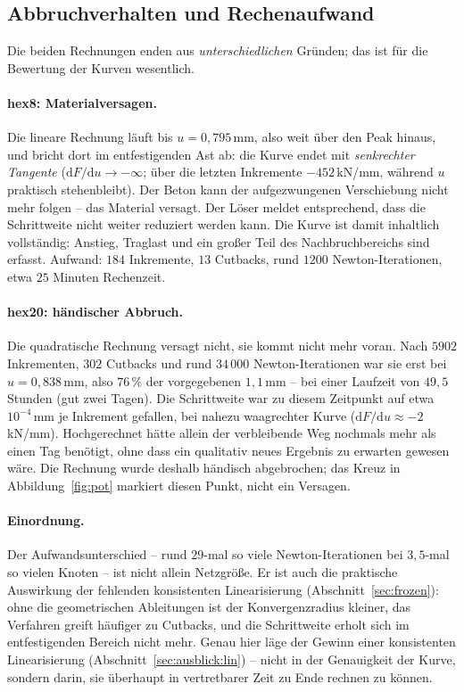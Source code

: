 \documentclass[a4paper,11pt]{article}
\begin{document}
\subsection{Abbruchverhalten und Rechenaufwand}
Die beiden Rechnungen enden aus \emph{unterschiedlichen} Gründen; das ist für die Bewertung der
Kurven wesentlich.

\paragraph{hex8: Materialversagen.}
Die lineare Rechnung läuft bis $u=0{,}795$\,mm, also weit über den Peak hinaus, und bricht dort im
entfestigenden Ast ab: die Kurve endet mit \emph{senkrechter Tangente}
($\mathrm dF/\mathrm du\to-\infty$; über die letzten Inkremente $-452$\,kN/mm, während $u$ praktisch
stehenbleibt). Der Beton kann der aufgezwungenen Verschiebung nicht mehr folgen -- das Material
versagt. Der Löser meldet entsprechend, dass die Schrittweite nicht weiter reduziert werden kann.
Die Kurve ist damit inhaltlich vollständig: Anstieg, Traglast und ein großer Teil des
Nachbruchbereichs sind erfasst. Aufwand: $184$ Inkremente, $13$ Cutbacks, rund $1200$
Newton-Iterationen, etwa $25$ Minuten Rechenzeit.

\paragraph{hex20: händischer Abbruch.}
Die quadratische Rechnung versagt nicht, sie kommt nicht mehr voran. Nach $5902$ Inkrementen,
$302$ Cutbacks und rund $34\,000$ Newton-Iterationen war sie erst bei $u=0{,}838$\,mm, also
$76\,\%$ der vorgegebenen $1{,}1$\,mm -- bei einer Laufzeit von $49{,}5$ Stunden
(gut zwei Tagen). Die Schrittweite war zu diesem Zeitpunkt auf etwa $10^{-4}$\,mm je Inkrement
gefallen, bei nahezu waagrechter Kurve ($\mathrm dF/\mathrm du\approx-2$\,kN/mm). Hochgerechnet
hätte allein der verbleibende Weg nochmals mehr als einen Tag benötigt, ohne dass ein qualitativ
neues Ergebnis zu erwarten gewesen wäre. Die Rechnung wurde deshalb händisch abgebrochen; das
Kreuz in Abbildung~\ref{fig:pot} markiert diesen Punkt, nicht ein Versagen.

\paragraph{Einordnung.}
Der Aufwandsunterschied -- rund $29$-mal so viele Newton-Iterationen bei $3{,}5$-mal so vielen
Knoten -- ist nicht allein Netzgröße. Er ist auch die praktische Auswirkung der fehlenden
konsistenten Linearisierung (Abschnitt~\ref{sec:frozen}): ohne die geometrischen Ableitungen ist
der Konvergenzradius kleiner, das Verfahren greift häufiger zu Cutbacks, und die Schrittweite
erholt sich im entfestigenden Bereich nicht mehr. Genau hier läge der Gewinn einer konsistenten
Linearisierung (Abschnitt~\ref{sec:ausblick:lin}) -- nicht in der Genauigkeit der Kurve, sondern darin,
sie überhaupt in vertretbarer Zeit zu Ende rechnen zu können.
\end{document}
